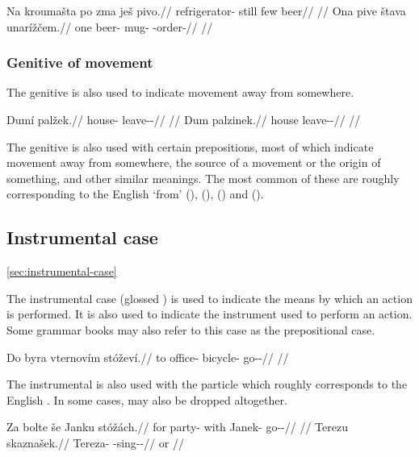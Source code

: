 \pex
\a
\begingl
\gla Na kroumašta po zma ješ pivo.//
\glb \Loc{} refrigerator-\Acc{} still few \Exst{} beer//
\glft {}//
\endgl
\a
\begingl
\gla Ona pive štava unarížčem.//
\glb one beer-\Gen{} mug-\Acc{} \Refl{}-order-//
\glft {}//
\endgl
\xe

\subsubsection{Genitive of movement}

The genitive is also used to indicate movement away from somewhere.

\pex
\a
\begingl
\gla Dumí palžek.//
\glb house-\Gen{} leave-\Av{}-\Pf{}//
\glft {}//
\endgl
\a
\begingl
\gla Dum palzinek.//
\glb house leave-\Pv{}-\Pf{}//
\glft {}//
\endgl
\xe

The genitive is also used with certain prepositions, most of which indicate movement away from somewhere, the source of a movement or the origin of something, and other similar meanings. The most common of these are  roughly corresponding to the English `from' (),  (),  () and  ().

\subsection{Instrumental case}\ref{sec:instrumental-case}

The instrumental case (glossed \Ins{}) is used to indicate the means by which an
action is performed. It is also used to indicate the instrument used to perform
an action. Some grammar books may also refer to this case as the prepositional
case.

\pex
\begingl
\gla Do byra vternovím stóževí.//
\glb to office-\Acc{} bicycle-\Ins{} go-\Av{}-\Cont{}//
\glft {}//
\endgl
\xe

The instrumental is also used with the particle  which roughly
corresponds to the English . In some cases,  may also be
dropped altogether.

\pex
\a\begingl
\gla Za bolte še Janku stóžách.//
\glb for party-\Acc{} with Janek-\Ins{} go-\Av{}-\Ctp{}//
\glft {}//
\endgl
\a\begingl
\gla Terezu skaznašek.//
\glb Tereza-\Ins{} \Soc{}-sing-\Av{}-\Pf{}//
\glft {} or //
\endgl
\xe

